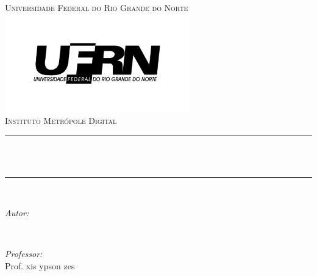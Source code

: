 \begin{titlepage}

\newcommand{\HRule}{\rule{\linewidth}{0.5mm}} %


 

\center %


\textsc{\LARGE Universidade Federal do Rio Grande do Norte}\\[0.5cm] %
\center
\includegraphics[width=8cm]{title/logo.png}\\[0.5cm]
\textsc{\large Instituto Metrópole Digital}\\[0.5cm] %

\makeatletter
\HRule \\[0.4cm]
{ \huge \bfseries \@title}\\[0.4cm] %
\HRule \\[1.5cm]
 

\begin{minipage}{0.4\textwidth}
\begin{flushleft} \large
\emph{Autor:}\\
\@author %
\end{flushleft}
\end{minipage}
~
\begin{minipage}{0.4\textwidth}
\begin{flushright} \large
\emph{Professor:} \\
Prof. xis ypson zes \\[1.2em] %
\end{flushright}
\end{minipage}\\[10cm]
\makeatother


\end{titlepage}
